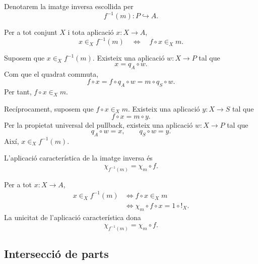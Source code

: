 \begin{notacio}\label{not:imatge-inversa}
Denotarem la imatge inversa escollida per
\[
f^{-1}(m):P\hookrightarrow A.
\]
\end{notacio}

\begin{proposicio}\label{prop:pertinenca-imatge-inversa}
Per a tot conjunt \(X\) i tota aplicació \(x:X\to A\),
\[
x\in_X f^{-1}(m)
\quad\Longleftrightarrow\quad
f\circ x\in_X m.
\]
\end{proposicio}

\begin{prova}
Suposem que \(x\in_X f^{-1}(m)\). Existeix una aplicació \(w:X\to P\) tal que
\[
x=q_A\circ w.
\]
Com que el quadrat commuta,
\[
f\circ x=f\circ q_A\circ w=m\circ q_S\circ w.
\]
Per tant, \(f\circ x\in_X m\).

Recíprocament, suposem que \(f\circ x\in_X m\). Existeix una aplicació \(y:X\to S\) tal que
\[
f\circ x=m\circ y.
\]
Per la propietat universal del pullback, existeix una aplicació \(w:X\to P\) tal que
\[
q_A\circ w=x,
\qquad
q_S\circ w=y.
\]
Així, \(x\in_X f^{-1}(m)\).
\end{prova}

\begin{proposicio}\label{prop:caracteristica-imatge-inversa}
L'aplicació característica de la imatge inversa és
\[
\chi_{f^{-1}(m)}=\chi_m\circ f.
\]
\end{proposicio}

\begin{prova}
Per a tot \(x:X\to A\),
\[
\begin{aligned}
x\in_X f^{-1}(m)
&\Longleftrightarrow f\circ x\in_X m\\
&\Longleftrightarrow \chi_m\circ f\circ x=1\circ {!}_X.
\end{aligned}
\]
La unicitat de l'aplicació característica dona
\[
\chi_{f^{-1}(m)}=\chi_m\circ f.
\]
\end{prova}

\subsection{Intersecció de parts}\label{sec:interseccio}

